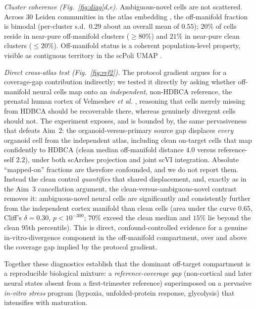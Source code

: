\documentclass[11pt]{article}
\begin{document}
\emph{Cluster coherence (Fig.~\ref{fig:diag}d,e).} Ambiguous-novel cells are not scattered. Across 30
Leiden communities in the atlas embedding \citep{traag2019leiden}, the off-manifold fraction is bimodal
(per-cluster s.d.\ $0.29$ about an overall mean of $0.55$); $20\%$ of cells reside in near-pure
off-manifold clusters ($\geq\!80\%$) and $21\%$ in near-pure clean clusters ($\leq\!20\%$). Off-manifold
status is a coherent population-level property, visible as contiguous territory in the scPoli UMAP
\citep{mcinnes2018umap}.

\emph{Direct cross-atlas test (Fig.~\ref{fig:ref2}).} The protocol gradient argues for a coverage-gap
contribution indirectly; we tested it directly by asking whether off-manifold neural cells map onto an
\emph{independent}, non-HDBCA reference, the prenatal human cortex of Velmeshev \emph{et al.}
\citep{velmeshev2023cortex}, reasoning that cells merely missing from HDBCA should be recoverable
there, whereas genuinely divergent cells should not. The experiment exposes, and is bounded by, the same
pervasiveness that defeats Aim~2: the organoid-versus-primary source gap displaces \emph{every} organoid
cell from the independent atlas, including clean on-target cells that map confidently to HDBCA (clean
median off-manifold distance $4.0$ versus reference-self $2.2$), under both scArches projection and joint
scVI integration. Absolute ``mapped-on'' fractions are therefore confounded, and we do not report them.
Instead the clean control \emph{quantifies} that shared displacement, and, exactly as in the Aim~3
cancellation argument, the clean-versus-ambiguous-novel contrast removes it: ambiguous-novel neural cells
are significantly and consistently further from the independent cortex manifold than clean cells (area
under the curve $0.65$, Cliff's $\delta=0.30$, $p<10^{-300}$; $70\%$ exceed the clean median and $15\%$
lie beyond the clean $95$th percentile). This is direct, confound-controlled evidence for a genuine
in-vitro-divergence component in the off-manifold compartment, over and above the coverage gap implied by
the protocol gradient.

Together these diagnostics establish that the dominant off-target compartment is a reproducible
biological mixture: a \emph{reference-coverage gap} (non-cortical and later neural states absent from a
first-trimester reference) superimposed on a pervasive \emph{in-vitro stress} program (hypoxia,
unfolded-protein response, glycolysis) that intensifies with maturation.
\end{document}
